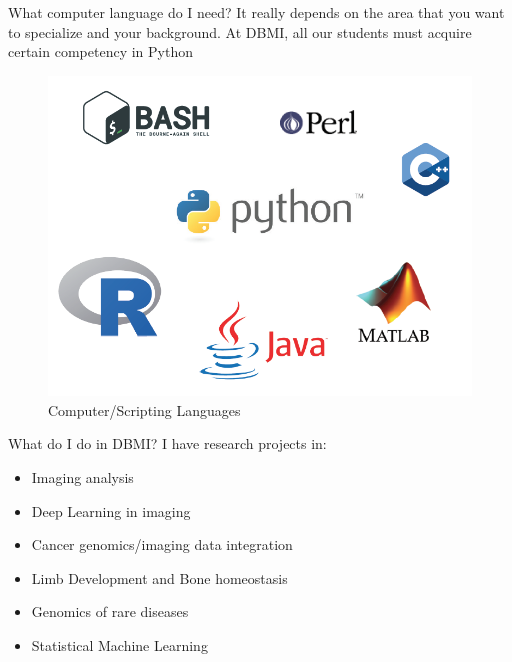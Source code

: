 \documentclass[11pt, aspectratio=43]{beamer}
\begin{document}
	
	\begin{frame}{What computer language do I need?}
		It really depends on the area that you want to specialize and your
		background. At DBMI, all our students must acquire certain competency in
		Python
		\begin{figure}[h]
			\centering
			\includegraphics[scale=0.45]{Figures/languages.png}
			\caption{Computer/Scripting Languages}
		\end{figure}
		
	\end{frame}
	
	\begin{frame}{What do I do in DBMI?}
		I have research projects in:
		\begin{itemize}
			\item Imaging analysis
			\item Deep Learning in imaging
			\item Cancer genomics/imaging data integration
			\item Limb Development and Bone homeostasis
			\item Genomics of rare diseases
			\item Statistical Machine Learning
		\end{itemize}
		
	\end{frame}
	
\end{document}
